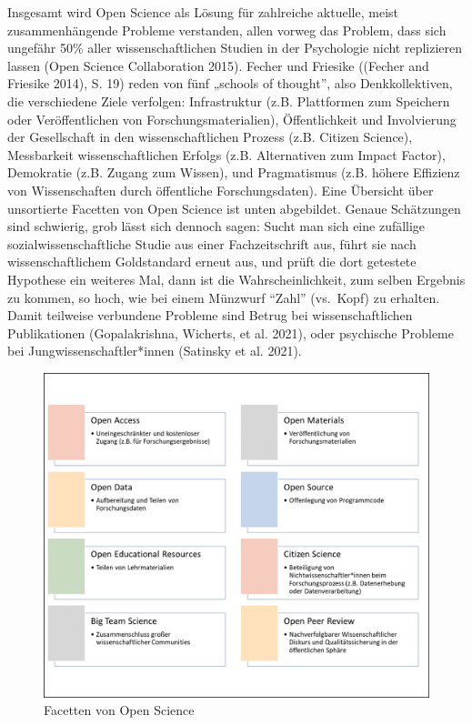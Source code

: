 \documentclass[
  letterpaper,
  DIV=11,
  numbers=noendperiod]{scrreprt}
\begin{document}
Insgesamt wird Open Science als Lösung für zahlreiche aktuelle, meist
zusammenhängende Probleme verstanden, allen vorweg das Problem, dass
sich ungefähr 50\% aller wissenschaftlichen Studien in der Psychologie
nicht replizieren lassen (Open Science Collaboration 2015). Fecher und
Friesike ((Fecher and Friesike 2014), S. 19) reden von fünf „schools of
thought'', also Denkkollektiven, die verschiedene Ziele verfolgen:
Infrastruktur (z.B. Plattformen zum Speichern oder Veröffentlichen von
Forschungsmaterialien), Öffentlichkeit und Involvierung der Gesellschaft
in den wissenschaftlichen Prozess (z.B. Citizen Science), Messbarkeit
wissenschaftlichen Erfolgs (z.B. Alternativen zum Impact Factor),
Demokratie (z.B. Zugang zum Wissen), und Pragmatismus (z.B. höhere
Effizienz von Wissenschaften durch öffentliche Forschungsdaten). Eine
Übersicht über unsortierte Facetten von Open Science ist unten
abgebildet. Genaue Schätzungen sind schwierig, grob lässt sich dennoch
sagen: Sucht man sich eine zufällige sozialwissenschaftliche Studie aus
einer Fachzeitschrift aus, führt sie nach wissenschaftlichem
Goldstandard erneut aus, und prüft die dort getestete Hypothese ein
weiteres Mal, dann ist die Wahrscheinlichkeit, zum selben Ergebnis zu
kommen, so hoch, wie bei einem Münzwurf ``Zahl'' (vs.~Kopf) zu erhalten.
Damit teilweise verbundene Probleme sind Betrug bei wissenschaftlichen
Publikationen (Gopalakrishna, Wicherts, et al. 2021), oder psychische
Probleme bei Jungwissenschaftler*innen (Satinsky et al. 2021).

\begin{figure}[H]

{\centering \includegraphics{images/facetten.jpg}

}

\caption{Facetten von Open Science}

\end{figure}%
\end{document}
